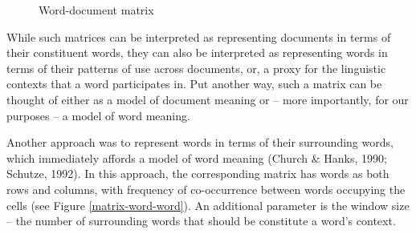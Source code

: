 \documentclass[man,floatsintext]{apa6}
\begin{document}

\begin{figure}
  \begin{center}
    \footnotesize{}
  \end{center} 
  \caption{Word-document matrix}
  \label{matrix-word-doc}
\end{figure}

While such matrices can be interpreted as representing documents in terms of their constituent words, they can also be interpreted as representing words in terms of their patterns of use across documents, or, a proxy for the linguistic contexts that a word participates in. Put another way, such a matrix can be thought of either as a model of document meaning or -- more importantly, for our purposes -- a model of word meaning. 

Another approach was to represent words in terms of their surrounding words, which immediately affords a model of word meaning (Church \& Hanks, 1990; Schutze, 1992). In this approach, the corresponding matrix has words as both rows and columns, with frequency of co-occurrence between words occupying the cells (see Figure \ref{matrix-word-word}). An additional parameter is the window size -- the number of surrounding words that should be constitute a word's context.
\end{document}
